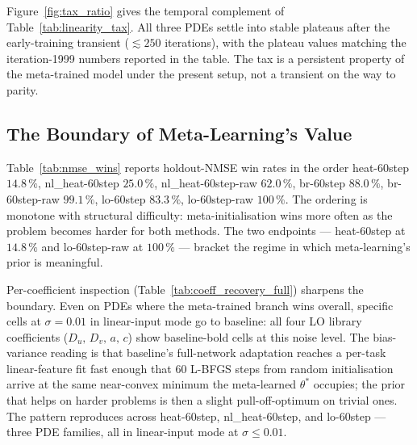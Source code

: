 \documentclass[10pt,journal,compsoc]{IEEEtran}
\begin{document}
Figure~\ref{fig:tax_ratio} gives the temporal complement of
Table~\ref{tab:linearity_tax}. All three PDEs settle into stable
plateaus after the early-training transient ($\lesssim 250$
iterations), with the plateau values matching the iteration-1999
numbers reported in the table. The tax is a persistent property of
the meta-trained model under the present setup, not a transient on
the way to parity.

\subsection{The Boundary of Meta-Learning's Value}\label{subsec:eval_value_boundary}

Table~\ref{tab:nmse_wins} reports holdout-NMSE win rates in the order
heat-60step $14.8\,\%$, nl\_heat-60step $25.0\,\%$,
nl\_heat-60step-raw $62.0\,\%$, br-60step $88.0\,\%$,
br-60step-raw $99.1\,\%$, lo-60step $83.3\,\%$,
lo-60step-raw $100\,\%$. The ordering is monotone with structural
difficulty: meta-initialisation wins more often as the problem
becomes harder for both methods. The two endpoints --- heat-60step
at $14.8\,\%$ and lo-60step-raw at $100\,\%$ --- bracket the regime
in which meta-learning's prior is meaningful.

Per-coefficient inspection (Table~\ref{tab:coeff_recovery_full})
sharpens the boundary. Even on PDEs where the meta-trained branch
wins overall, specific cells at $\sigma{=}0.01$ in linear-input mode
go to baseline: all four LO library coefficients
($D_u,\,D_v,\,a,\,c$) show baseline-bold cells at this noise level.
The bias-variance reading is that baseline's full-network adaptation
reaches a per-task linear-feature fit fast enough that 60 L-BFGS
steps from random initialisation arrive at the same near-convex
minimum the meta-learned $\theta^*$ occupies; the prior that helps
on harder problems is then a slight pull-off-optimum on trivial
ones. The pattern reproduces across heat-60step, nl\_heat-60step,
and lo-60step --- three PDE families, all in linear-input mode at
$\sigma \leq 0.01$.
\end{document}
